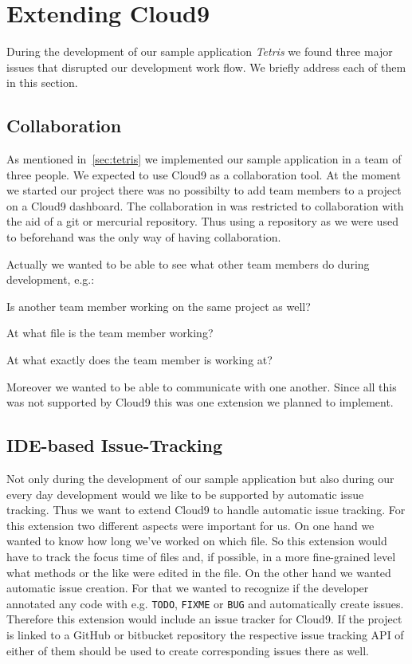 \section{Extending Cloud9}
\label{sec:Approaches}
During the development of our sample application \emph{Tetris} we found three major issues that disrupted our development work flow.
We briefly address each of them in this section.

\subsection{Collaboration}
As mentioned in~\ref{sec:tetris} we implemented our sample application in a team of three people.
We expected to use Cloud9 as a collaboration tool.
At the moment we started our project there was no possibilty to add team members to a project on a Cloud9 dashboard.
The collaboration in  was restricted to collaboration with the aid of a git or mercurial repository.
Thus using a repository as we were used to beforehand was the only way of having collaboration.

Actually we wanted to be able to see what other team members do during development, e.g.:
\begin{packed_itemize}
    \item Is another team member working on the same project as well?
    \item At what file is the team member working?
    \item At what exactly does the team member is working at?
\end{packed_itemize}
Moreover we wanted to be able to communicate with one another.
Since all this was not supported by Cloud9 this was one extension we planned to implement.

\subsection{IDE-based Issue-Tracking}
Not only during the development of our sample application but also during our every day development would we like to be supported by automatic issue tracking.
Thus we want to extend Cloud9 to handle automatic issue tracking.
For this extension two different aspects were important for us.
On one hand we wanted to know how long we've worked on which file.
So this extension would have to track the focus time of files and, if possible, in a more fine-grained level what methods or the like were edited in the file.
On the other hand we wanted automatic issue creation.
For that we wanted to recognize if the developer annotated any code with e.g. \texttt{TODO}, \texttt{FIXME} or \texttt{BUG} and automatically create issues.
Therefore this extension would include an issue tracker for Cloud9.
If the project is linked to a GitHub or bitbucket repository the respective issue tracking API of either of them should be used to create corresponding issues there as well.

